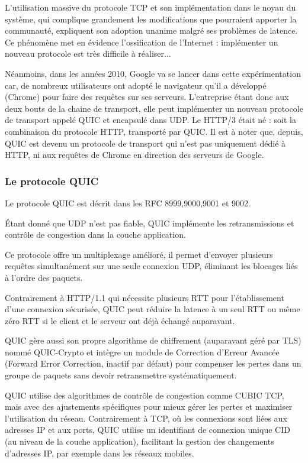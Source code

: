 \documentclass[a4paper,12pt]{article}
\begin{document}
L'utilisation massive du protocole TCP et son implémentation dans le noyau du système, qui complique grandement les modifications que pourraient apporter la communauté, expliquent son adoption unanime malgré ses problèmes de latence. Ce phénomène met en évidence l'ossification de l'Internet : implémenter un nouveau protocole est très difficile à réaliser...

Néanmoins, dans les années 2010, Google va se lancer dans cette expérimentation car, de nombreux utilisateurs ont adopté le navigateur qu'il a développé (Chrome) pour faire des requêtes sur ses serveurs. L'entreprise étant donc aux deux bouts de la chaine de transport, elle peut implémenter un nouveau protocole de transport appelé QUIC et encapsulé dans UDP. Le HTTP/3 était né : soit la combinaison du protocole HTTP, transporté par QUIC. Il est à noter que, depuis, QUIC est devenu un protocole de transport qui n'est pas uniquement dédié à HTTP, ni aux requêtes de Chrome en direction des serveurs de Google.

\subsubsection {Le protocole QUIC}

Le protocole QUIC est décrit dans les RFC 8999,9000,9001 et 9002\cite{iyengar_quic_2021}. 


Étant donné que UDP n’est pas fiable, QUIC implémente les retransmissions et contrôle
de congestion dans la couche application.

Ce protocole offre un multiplexage amélioré, il permet d'envoyer plusieurs requêtes
simultanément sur une seule connexion UDP, éliminant les blocages liés à l'ordre des
paquets.

Contrairement à HTTP/1.1 qui nécessite plusieurs RTT pour l'établissement d'une
connexion sécurisée, QUIC peut réduire la latence à un seul RTT ou même zéro RTT si le
client et le serveur ont déjà échangé auparavant.

QUIC gère aussi son propre algorithme de chiffrement (auparavant géré par TLS) nommé
QUIC-Crypto et intègre un module de Correction d'Erreur Avancée (Forward Error
Correction, inactif par défaut) pour compenser les pertes dans un groupe de paquets sans
devoir retransmettre systématiquement.

QUIC utilise des algorithmes de contrôle de congestion comme CUBIC TCP, mais avec
des ajustements spécifiques pour mieux gérer les pertes et maximiser l'utilisation du
réseau. Contrairement à TCP, où les connexions sont liées aux adresses IP et aux ports,
QUIC utilise un identifiant de connexion unique CID (au niveau de la couche application),
facilitant la gestion des changements d'adresses IP, par exemple dans les réseaux
mobiles.
\end{document}
